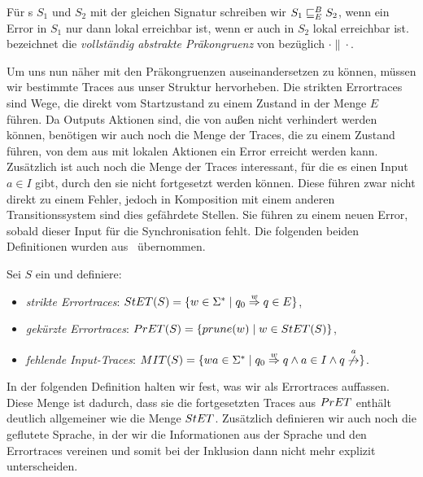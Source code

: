 \begin{Def}
  Für \EIO{}s $S_1$ und $S_2$ mit der gleichen Signatur schreiben wir
  $S_1\sqsubseteq _E^B S_2$, wenn ein Error in $S_1$ nur dann lokal erreichbar ist, wenn er
  auch in $S_2$ lokal erreichbar ist.\\
  \ECRel{} bezeichnet die \emph{vollständig abstrakte Präkongruenz} von \EBRel{}
  bezüglich $\cdot\|\cdot$.
\end{Def}

Um uns nun näher mit den Präkongruenzen auseinandersetzen zu können, müssen wir bestimmte Traces
aus unser Struktur hervorheben. Die strikten Errortraces sind Wege, die
direkt vom Startzustand zu einem Zustand in der Menge $E$ führen. Da Outputs Aktionen
sind, die von außen nicht verhindert werden können, benötigen wir auch noch die
Menge der Traces, die zu einem Zustand führen, von dem aus mit lokalen Aktionen
ein Error erreicht werden kann. Zusätzlich ist auch noch die Menge der Traces
interessant, für die es einen Input $a\in I$ gibt, durch den sie nicht
fortgesetzt werden können. Diese führen zwar nicht
direkt zu einem Fehler, jedoch in Komposition mit einem anderen
Transitionssystem sind
dies gefährdete Stellen. Sie führen zu einem neuen Error, sobald dieser Input
für die Synchronisation fehlt. Die folgenden beiden Definitionen wurden
aus~\cite{Vogler2014EIO} übernommen.

\begin{Def}[Errortraces]
  \label{DefErrortraces}
  Sei $S$ ein \EIO{} und definiere:
  \begin{itemize}
    \item \emph{strikte Errortraces}: $StET{}(S)=\{w\in\Sigma
      ^*\mid q_0\overset{w}{\Rightarrow}q\in E\}$,
    \item \emph{gekürzte Errortraces}: $PrET{}(S)=\{prune{}(w)\mid w\in StET{}(S)\}$,
    \item \emph{fehlende Input-Traces}: $\MIT{}(S)=\{wa\in\Sigma ^*\mid
      q_0\overset{w}{\Rightarrow}q\wedge a\in I\wedge
    q\overset{a}{\not{\hspace{-0.1cm}\rightarrow}}\}$.
  \end{itemize}
\end{Def}

In der folgenden Definition halten wir fest, was wir als Errortraces auffassen.
Diese Menge ist dadurch, dass sie die fortgesetzten Traces aus $PrET{}$ enthält
deutlich allgemeiner wie die Menge $StET{}$. Zusätzlich definieren wir auch noch
die geflutete Sprache, in der wir die Informationen aus der Sprache und den
Errortraces vereinen und somit bei der Inklusion dann nicht mehr explizit
unterscheiden.

